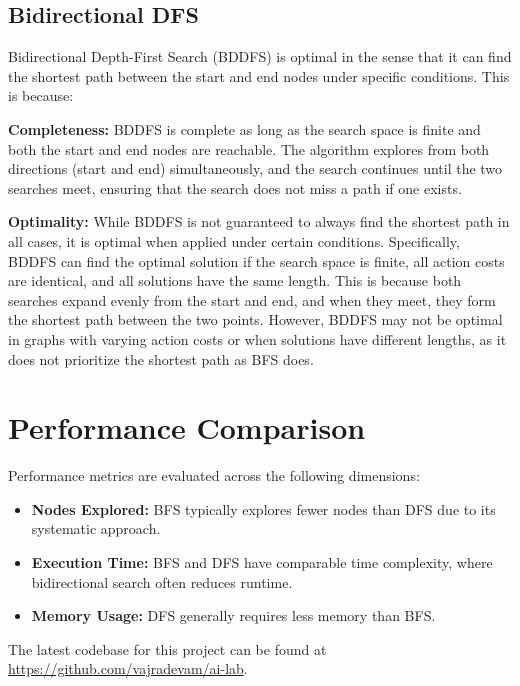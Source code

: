 \documentclass[final, journal, 11pt]{report}
\begin{document}
		\subsection*{Bidirectional DFS}
		Bidirectional Depth-First Search (BDDFS) is optimal in the sense that it can find the shortest path between the start and end nodes under specific conditions. This is because:
		
		\textbf{Completeness:} BDDFS is complete as long as the search space is finite and both the start and end nodes are reachable. The algorithm explores from both directions (start and end) simultaneously, and the search continues until the two searches meet, ensuring that the search does not miss a path if one exists.
		
		\textbf{Optimality:} While BDDFS is not guaranteed to always find the shortest path in all cases, it is optimal when applied under certain conditions. Specifically, BDDFS can find the optimal solution if the search space is finite, all action costs are identical, and all solutions have the same length. This is because both searches expand evenly from the start and end, and when they meet, they form the shortest path between the two points. However, BDDFS may not be optimal in graphs with varying action costs or when solutions have different lengths, as it does not prioritize the shortest path as BFS does.
		
		
	
	\section*{Performance Comparison}
	Performance metrics are evaluated across the following dimensions:
	\begin{itemize}
		\item \textbf{Nodes Explored:} BFS typically explores fewer nodes than DFS due to its systematic approach.
		\item \textbf{Execution Time:} BFS and DFS have comparable time complexity, where bidirectional search often reduces runtime.
		\item \textbf{Memory Usage:} DFS generally requires less memory than BFS.
	\end{itemize}
	
	The latest codebase for this project can be found at \href{https://github.com/vajradevam/ai-lab}{https://github.com/vajradevam/ai-lab}.
	
\end{document}
